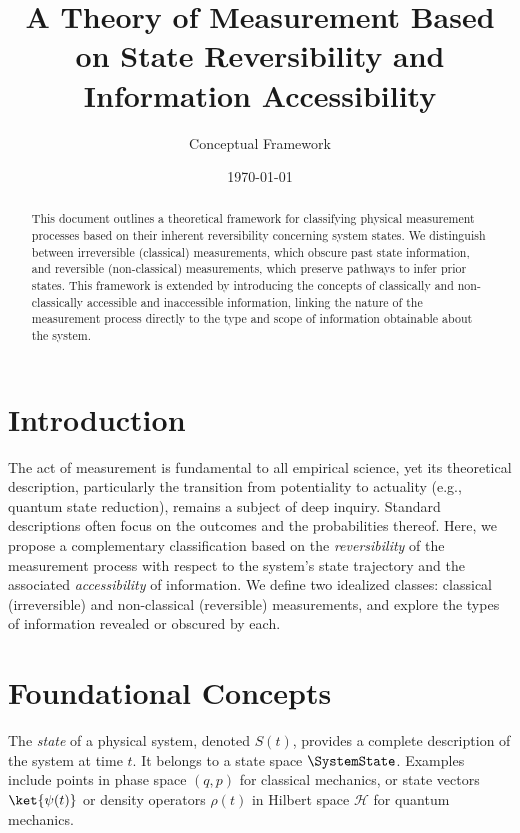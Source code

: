 	
	\title{A Theory of Measurement Based on State Reversibility and Information Accessibility}
	\author{Conceptual Framework}
	\date{\today} %
	
	
	\begin{abstract}
		This document outlines a theoretical framework for classifying physical measurement processes based on their inherent reversibility concerning system states. We distinguish between irreversible (classical) measurements, which obscure past state information, and reversible (non-classical) measurements, which preserve pathways to infer prior states. This framework is extended by introducing the concepts of classically and non-classically accessible and inaccessible information, linking the nature of the measurement process directly to the type and scope of information obtainable about the system.
	\end{abstract}
	
	
	\section{Introduction}
	The act of measurement is fundamental to all empirical science, yet its theoretical description, particularly the transition from potentiality to actuality (e.g., quantum state reduction), remains a subject of deep inquiry. Standard descriptions often focus on the outcomes and the probabilities thereof. Here, we propose a complementary classification based on the \emph{reversibility} of the measurement process with respect to the system's state trajectory and the associated \emph{accessibility} of information. We define two idealized classes: classical (irreversible) and non-classical (reversible) measurements, and explore the types of information revealed or obscured by each.
	
	\section{Foundational Concepts}
	
	\begin{definition}
		The \emph{state} of a physical system, denoted $S(t)$, provides a complete description of the system at time $t$. It belongs to a state space $\SystemState$. Examples include points in phase space $(q,p)$ for classical mechanics, or state vectors $\ket{\psi(t)}$ or density operators $\rho(t)$ in Hilbert space $\mathcal{H}$ for quantum mechanics.
	\end{definition}
	
